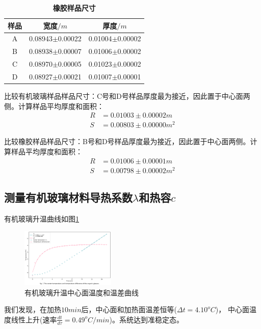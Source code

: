 \documentclass[10pt,a4paper,twocolumn,twoside,UTF8]{ctexart}
\begin{document}
	\begin{table}[htbp]
    	\centering
    	\begin{tabular}{ccc}
			\toprule
			样品	&宽度$/m$ &厚度$/m$ \\
			\midrule
			A	&0.08943$\pm$0.00022	&0.01004$\pm$0.00002	\\
			B	&0.08938$\pm$0.00007	&0.01006$\pm$0.00002	\\
			C	&0.08970$\pm$0.00005	&0.01023$\pm$0.00002	\\
			D	&0.08927$\pm$0.00021	&0.01007$\pm$0.00001	\\
			\bottomrule
		\end{tabular}
		\caption{\textbf{橡胶样品尺寸}}
		\label{tab:1.2}
    \end{table}

	比较有机玻璃样品样品尺寸：C号和D号样品厚度最为接近，因此置于中心面两侧。计算样品平均厚度和面积：
	\begin{align}
		R &= 0.01003 \pm 0.00002 m \\
		S &= 0.00803 \pm  0.00000 m^2 
	\end{align}

	比较橡胶样品样品尺寸：B号和D号样品厚度最为接近，因此置于中心面两侧。计算样品平均厚度和面积：
	\begin{align}
		R &= 0.01006 \pm 0.00001 m \\
		S &= 0.00798 \pm  0.00002 m^2 
	\end{align}

	\subsection{测量有机玻璃材料导热系数$\lambda$和热容$c$}

	有机玻璃升温曲线如图\ref{fig:1}
	\begin{figure}[htbp]
		\centering
		\includegraphics[width=0.4\textwidth]{attachments/fig.1.png}
		\caption{有机玻璃升温中心面温度和温差曲线}
		\label{fig:1}
	\end{figure}	

	我们发现，在加热$10min$后，中心面和加热面温差恒等($\Delta t = 4.10 ^oC$)，
	中心面温度线性上升(速率$\frac{dt}{d\tau} = 0.49 ^oC/min$)。系统达到准稳定态。
\end{document}
